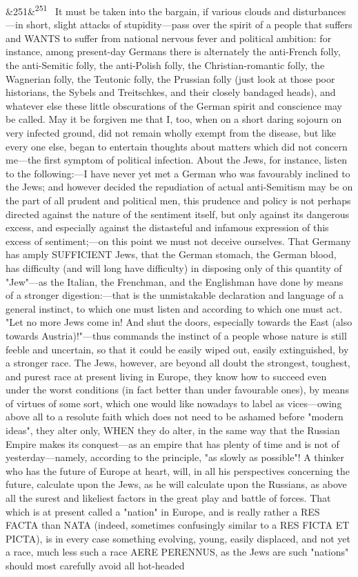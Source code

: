 \documentclass[12pt]{article}
\newcommand{\para}[1][]{\par\noindent\ifx&#1&\else\textsuperscript{\footnotesize #1}~\fi}
\begin{document}
\para[251] It must be taken into the bargain, if various clouds and disturbances---in short, slight attacks of stupidity---pass over the spirit of a people that suffers and WANTS to suffer from national nervous fever and political ambition: for instance, among present-day Germans there is alternately the anti-French folly, the anti-Semitic folly, the anti-Polish folly, the Christian-romantic folly, the Wagnerian folly, the Teutonic folly, the Prussian folly (just look at those poor historians, the Sybels and Treitschkes, and their closely bandaged heads), and whatever else these little obscurations of the German spirit and conscience may be called. May it be forgiven me that I, too, when on a short daring sojourn on very infected ground, did not remain wholly exempt from the disease, but like every one else, began to entertain thoughts about matters which did not concern me---the first symptom of political infection. About the Jews, for instance, listen to the following:---I have never yet met a German who was favourably inclined to the Jews; and however decided the repudiation of actual anti-Semitism may be on the part of all prudent and political men, this prudence and policy is not perhaps directed against the nature of the sentiment itself, but only against its dangerous excess, and especially against the distasteful and infamous expression of this excess of sentiment;---on this point we must not deceive ourselves. That Germany has amply SUFFICIENT Jews, that the German stomach, the German blood, has difficulty (and will long have difficulty) in disposing only of this quantity of "Jew"---as the Italian, the Frenchman, and the Englishman have done by means of a stronger digestion:---that is the unmistakable declaration and language of a general instinct, to which one must listen and according to which one must act. "Let no more Jews come in! And shut the doors, especially towards the East (also towards Austria)!"---thus commands the instinct of a people whose nature is still feeble and uncertain, so that it could be easily wiped out, easily extinguished, by a stronger race. The Jews, however, are beyond all doubt the strongest, toughest, and purest race at present living in Europe, they know how to succeed even under the worst conditions (in fact better than under favourable ones), by means of virtues of some sort, which one would like nowadays to label as vices---owing above all to a resolute faith which does not need to be ashamed before "modern ideas", they alter only, WHEN they do alter, in the same way that the Russian Empire makes its conquest---as an empire that has plenty of time and is not of yesterday---namely, according to the principle, "as slowly as possible"! A thinker who has the future of Europe at heart, will, in all his perspectives concerning the future, calculate upon the Jews, as he will calculate upon the Russians, as above all the surest and likeliest factors in the great play and battle of forces. That which is at present called a "nation" in Europe, and is really rather a RES FACTA than NATA (indeed, sometimes confusingly similar to a RES FICTA ET PICTA), is in every case something evolving, young, easily displaced, and not yet a race, much less such a race AERE PERENNUS, as the Jews are such "nations" should most carefully avoid all hot-headed 
\end{document}
